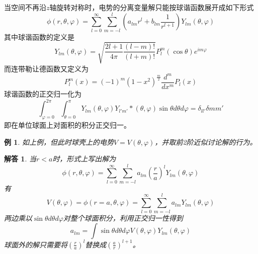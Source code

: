 \documentclass[a4paper,11pt]{ctexart}
\newtheorem{eg}{例}[section]
\newtheorem{ans}{解答}[section]
\newcommand{\beq}{\begin{equation}}
\newcommand{\eeq}{\end{equation}}
\begin{document}
\par
当空间不再沿$z$轴旋转对称时，电势的分离变量解只能按球谐函数展开成如下形式
\beq
\phi(r,\theta,\varphi) =\sum_{l=0}^\infty \sum_{m=-l}^{l} \left( a_{lm} r^l + b_{lm} \frac{1}{r^{l+1}}\right) Y_{lm}(\theta,\varphi)
\eeq
其中球谐函数的定义是
\beq
Y_{lm}(\theta,\varphi) = \sqrt{ \frac{2l+1}{4\pi} \frac{(l-m)!}{(l+m)!}} P_l^m(\cos \theta) e^{im\varphi}
\eeq
而连带勒让德函数又定义为
\beq
P_l^m (x) = (-1)^m (1-x^2)^{\frac{m}{2}} \frac{d^m}{dx^m} P_l(x)
\eeq
球谐函数的正交归一化为
\beq
\int_{\varphi = 0}^{2\pi} \int_{\theta = 0}^\pi Y_{lm}(\theta,\varphi) Y_{l'm'}*(\theta,\varphi) \sin \theta d\theta d \varphi = \delta_{ll'} \delta{mm'}
\eeq
即在单位球面上对面积的积分正交归一。
\begin{eg}
如上例，但此时球壳上的电势$V=V(\theta,\varphi)$，并取前2阶近似讨论解的行为。
\end{eg}
\begin{ans}
当$r<a$时，形式上写出解为
\beq
\phi(r,\theta,\varphi) =\sum_{l=0}^\infty \sum_{m=-l}^{l} a_{lm} \left( \frac{r}{a} \right)^lY_{lm}(\theta,\varphi)
\eeq
有
\beq
V(\theta,\varphi) = \phi(r=a,\theta,\varphi) = \sum_{l=0}^\infty \sum_{m=-l}^{l} a_{lm} Y_{lm}(\theta,\varphi)
\eeq
两边乘以$\sin \theta d\theta d \varphi$对整个球面积分，利用正交归一性得到
\beq
a_{lm} = \int \sin \theta d \theta d \varphi V(\theta,\varphi) Y_{lm}(\theta,\varphi)
\eeq
球面外的解只需要将$\left(\frac{r}{a}\right)^l$替换成$\left( \frac{a}{r}\right)^{l+1}$。
 
 
\end{ans}
\end{document}
